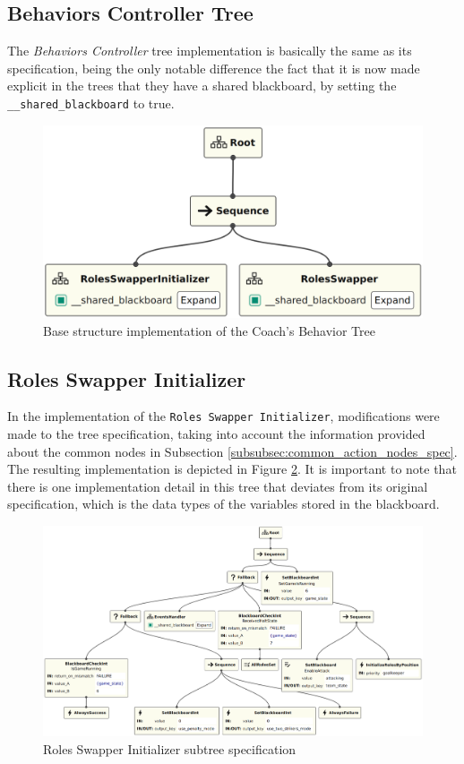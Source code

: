 \subsection{Behaviors Controller Tree}

The \textit{Behaviors Controller} tree implementation is basically the same as its specification, being the only notable difference the fact that it is now made explicit in the trees that they have a shared blackboard, by setting the \texttt{\_\_shared\_blackboard} to true.

\begin{figure}[!h]
    \centering
    \includegraphics[width=0.7\linewidth]{images/implementation/BehaviorsController.png}
    \caption{Base structure implementation of the Coach’s Behavior Tree}
    \label{fig:behaviors_controller_bt_impl}
\end{figure}

\subsection{Roles Swapper Initializer}

In the implementation of the \texttt{Roles Swapper Initializer}, modifications were made to the tree specification, taking into account the information provided about the common nodes in Subsection \ref{subsubsec:common_action_nodes_spec}. The resulting implementation is depicted in Figure \ref{fig:roles_swapper_initializer_impl}. It is important to note that there is one implementation detail in this tree that deviates from its original specification, which is the data types of the variables stored in the blackboard.

\begin{figure}[!h]
    \centering
    \includegraphics[width=1.0\linewidth]{images/implementation/RolesSwapperInitializer.png}
    \caption{Roles Swapper Initializer subtree specification}
    \label{fig:roles_swapper_initializer_impl}
\end{figure}

